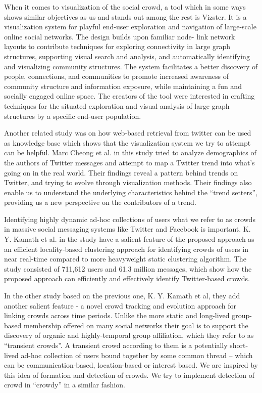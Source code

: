 \documentclass{sig-alternate}
\begin{document}
When it comes to visualization of the social crowd, a tool which in some ways
shows similar objectives as us and stands out among the rest is
Vizster\cite{heer2005vizster}. It is a visualization system for playful
end-user exploration and navigation of large-scale online social networks. The
design builds upon familiar node- link network layouts to contribute techniques
for exploring connectivity in large graph structures, supporting visual search
and analysis, and automatically identifying and visualizing community
structures. The system facilitates a better discovery of people, connections,
and communities to promote increased awareness of community structure and
information exposure, while maintaining a fun and socially engaged online
space. The creators of the tool were interested in crafting techniques for the
situated exploration and visual analysis of large graph structures by a
specific end-user population.

Another related study was on how web-based retrieval from twitter can be used
as knowledge base\cite{cheong2009integrating} which shows that the
visualization system we try to attempt can be helpful. Marc Cheong et al. in
this study tried to analyze demographics of the authors of Twitter messages and
attempt to map a Twitter trend into what's going on in the real world. Their
findings reveal a pattern behind trends on Twitter, and trying to evolve
through visualization methods.  Their findings also enable us to understand the
underlying characteristics behind the ``trend setters'', providing us a new
perspective on the contributors of a trend.

Identifying highly dynamic ad-hoc collections of users what we refer to as
crowds in massive social messaging systems like Twitter and Facebook is
important\cite{kamath2010identifying}. K. Y. Kamath et al. in the study have a
salient feature of the proposed approach as an efficient locality-based
clustering approach for identifying crowds of users in near real-time compared
to more heavyweight static clustering algorithm. The study consisted of 711,612
users and 61.3 million messages, which show how the proposed approach can
efficiently and effectively identify Twitter-based crowds.

In the other study based on the previous one, K. Y. Kamath et
al\cite{kamath2011transient}, they add another salient feature - a novel crowd
tracking and evolution approach for linking crowds across time periods. Unlike
the more static and long-lived group-based membership offered on many social
networks their goal is to support the discovery of organic and highly-temporal
group affiliation, which they refer to as ``transient crowds''. A transient
crowd according to them is a potentially short-lived ad-hoc collection of users
bound together by some common thread – which can be communication-based,
location-based or interest based. We are inspired by this idea of formation and
detection of crowds. We try to implement detection of crowd in “crowdy” in a
similar fashion.
\end{document}
